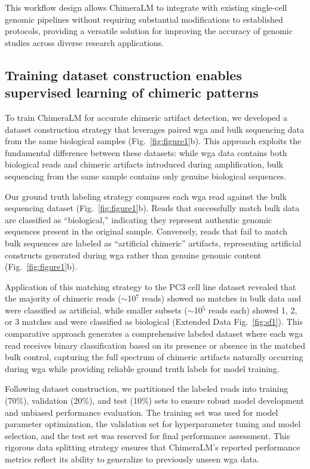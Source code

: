 \documentclass[pdflatex,sn-nature]{sn-jnl}%
\theoremstyle{thmstyleone}%
\theoremstyle{thmstyletwo}%
\theoremstyle{thmstylethree}%
\begin{document}
This workflow design allows ChimeraLM to integrate with existing single-cell genomic pipelines without requiring substantial modifications to established protocols, providing a versatile solution for improving the accuracy of genomic studies across diverse research applications.

\subsection*{Training dataset construction enables supervised learning of chimeric patterns}

To train ChimeraLM for accurate chimeric artifact detection, we developed a dataset construction strategy that leverages paired \gls{wga} and bulk sequencing data from the same biological samples (Fig.~\ref{fig:figure1}b).
This approach exploits the fundamental difference between these datasets: while \gls{wga} data contains both biological reads and chimeric artifacts introduced during amplification, bulk sequencing from the same sample contains only genuine biological sequences.

Our ground truth labeling strategy compares each \gls{wga} read against the bulk sequencing dataset (Fig.~\ref{fig:figure1}b).
Reads that successfully match bulk data are classified as ``biological,'' indicating they represent authentic genomic sequences present in the original sample.
Conversely, reads that fail to match bulk sequences are labeled as ``artificial chimeric'' artifacts, representing artificial constructs generated during \gls{wga} rather than genuine genomic content (Fig.~\ref{fig:figure1}b).

Application of this matching strategy to the PC3 cell line dataset revealed that the majority of chimeric reads ($\sim$10$^7$ reads) showed no matches in bulk data and were classified as artificial, while smaller subsets ($\sim$10$^5$ reads each) showed 1, 2, or 3 matches and were classified as biological (Extended Data Fig.~\ref{fig:sf1}).
This comparative approach generates a comprehensive labeled dataset where each \gls{wga} read receives binary classification based on its presence or absence in the matched bulk control, capturing the full spectrum of chimeric artifacts naturally occurring during \gls{wga} while providing reliable ground truth labels for model training.

Following dataset construction, we partitioned the labeled reads into training (70\%), validation (20\%), and test (10\%) sets to ensure robust model development and unbiased performance evaluation.
The training set was used for model parameter optimization, the validation set for hyperparameter tuning and model selection, and the test set was reserved for final performance assessment.
This rigorous data splitting strategy ensures that ChimeraLM's reported performance metrics reflect its ability to generalize to previously unseen \gls{wga} data.
\end{document}

